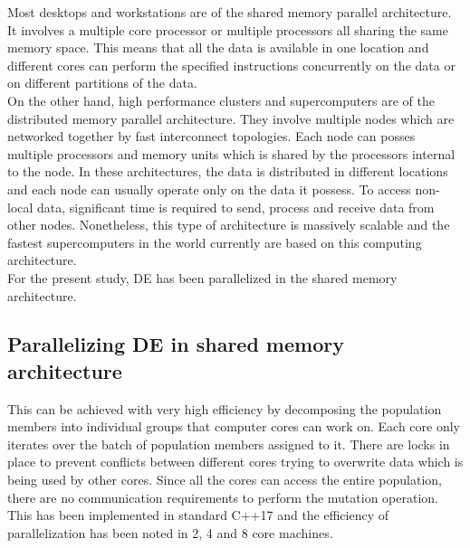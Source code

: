 Most desktops and workstations are of the shared memory parallel architecture. It involves a multiple core processor or multiple processors all sharing the same memory space. This means that all the data is available in one location and different cores can perform the specified instructions concurrently on the data or on different partitions of the data.\\
On the other hand, high performance clusters and supercomputers are of the distributed memory parallel architecture. They involve multiple nodes which are networked together by fast interconnect topologies. Each node can posses multiple processors and memory units which is shared by the processors internal to the node. In these architectures, the data is distributed in different locations and each node can usually operate only on the data it possess. To access non-local data, significant time is required to send, process and receive data from other nodes. Nonetheless, this type of architecture is massively scalable and the fastest supercomputers in the world currently are based on this computing architecture.\\
For the present study, DE has been parallelized in the shared memory architecture.
\subsection{Parallelizing DE in shared memory architecture}
This can be achieved with very high efficiency by decomposing the population members into individual groups that computer cores can work on. Each core only iterates over the batch of population members assigned to it. There are locks in place to prevent conflicts between different cores trying to overwrite data which is being used by other cores. Since all the cores can access the entire population, there are no communication requirements to perform the mutation operation. This has been implemented in standard C++17 and the efficiency of parallelization has been noted in 2, 4 and 8 core machines.  


